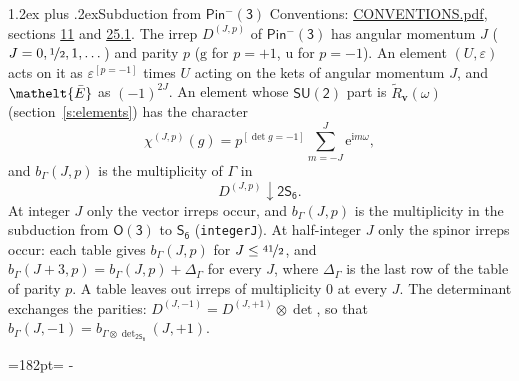 \documentclass[10pt,a4paper]{article}
\makeatletter
\renewcommand\section{\@startsection{section}{1}{\z@}{-3ex plus -1ex minus -.2ex}%
  {1.2ex plus .2ex}{\normalfont\large\sffamily\bfseries\color{parttitle}}}
\newcommand{\needspace}[1]{\par\penalty-100\begingroup\dimen0=#1\relax\dimen2=\pagegoal
  \advance\dimen2-\pagetotal\ifdim\dimen0>\dimen2\relax\ifdim\dimen2>0pt\vfil\break\fi\fi
  \endgroup}
\numberwithin{equation}{section}
\newcommand{\eltfont}[1]{{\let\sigma\eltsigma\mathelt{#1}}}
\newcommand{\grp}[1]{\mathsf{#1}}
\newcommand{\elt}[1]{\eltfont{#1}}
\newcommand{\ptag}[1]{\mathrm{#1}}
\newcommand{\iverson}[1]{[#1]}
\newcommand{\restr}[2]{#1\!\downarrow#2}
\newcommand{\vv}{\mathbf{v}}
\newcommand{\iunit}{\mathrm{i}}
\newcommand{\expe}{\mathrm{e}}
\newcommand{\irrJp}[2]{D^{(#1,#2)}}
\newcommand{\irrprod}{\otimes}
\newcommand{\barred}[1]{\bar{#1}}
\newcommand{\lift}[1]{\tilde{#1}}
\makeatother
\begin{document}
\section{Subduction from \texorpdfstring{$\grp{Pin^{-}(3)}$}{Pin(3)}}\label{s:subduction_parent}
Conventions: \href{../../CONVENTIONS.pdf}{CONVENTIONS.pdf}, sections \href{../../../rotation/CONVENTIONS.pdf\#conv.11}{11} and \href{../../CONVENTIONS.pdf\#conv.25.1}{25.1}.
\leavevmode\label{n:index.J}\label{n:index.parity}\label{n:irrep.o3}The irrep $\irrJp{J}{p}$ of \href{Pinminus3.pdf}{$\grp{Pin^{-}(3)}$} has angular momentum $J$ ($J = 0, \nicefrac{1}{2}, 1, \dots$) and parity $p$ ($\ptag{g}$ for $p = +1$, $\ptag{u}$ for $p = -1$). An element $(U, \varepsilon)$ acts on it as $\varepsilon^{[p = -1]}$ times $U$ acting on the kets of angular momentum $J$, and $\elt{\barred{E}}$ as $(-1)^{2J}$. \label{n:function.character.parent}\label{n:function.multiplicity}An element whose $\grp{SU(2)}$ part is $\lift{R}_{\vv}(\omega)$ (section~\ref{s:elements}) has the character
\begin{equation}\label{e:chi}\chi^{(J,p)}(g) = p^{\iverson{\det g = -1}}\sum_{m=-J}^{J} \expe^{\iunit m\omega},\end{equation}
and $b_\Gamma(J, p)$ is the multiplicity of $\Gamma$ in
\begin{equation}\label{e:parent}\restr{\irrJp{J}{p}}{\grp{2S_{6}}}.\end{equation}
At integer $J$ only the vector irreps occur, and $b_\Gamma(J, p)$ is the multiplicity in the subduction from $\grp{O(3)}$ to \href{../../../rotation/data/pdf/S6.pdf}{$\grp{S_{6}}$} (\texttt{integerJ}). \label{n:index.increment}At half-integer $J$ only the spinor irreps occur: each table gives $b_\Gamma(J, p)$ for $J \le \nicefrac{41}{2}$, and $b_\Gamma(J + 3, p) = b_\Gamma(J, p) + \Delta_\Gamma$ for every $J$, where $\Delta_\Gamma$ is the last row of the table of parity $p$. A table leaves out irreps of multiplicity 0 at every $J$.
\leavevmode\label{n:operator.determinant.character}The determinant exchanges the parities: $\irrJp{J}{-1} = \irrJp{J}{+1} \irrprod \det$, so that $b_\Gamma(J, -1) = b_{\Gamma \irrprod \det_{\grp{2S_{6}}}}(J, +1)$.
\needspace{182pt}
\end{document}

